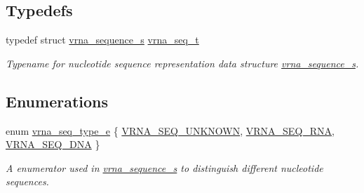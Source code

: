\subsection*{Typedefs}
\begin{DoxyCompactItemize}
\item 
\mbox{\label{group__alphabet__utils_gaa35bee3061759495467070b47d0e1f22}} 
typedef struct \mbox{\hyperlink{group__alphabet__utils_structvrna__sequence__s}{vrna\+\_\+sequence\+\_\+s}} \mbox{\hyperlink{group__alphabet__utils_gaa35bee3061759495467070b47d0e1f22}{vrna\+\_\+seq\+\_\+t}}
\begin{DoxyCompactList}\small\item\em Typename for nucleotide sequence representation data structure \mbox{\hyperlink{group__alphabet__utils_structvrna__sequence__s}{vrna\+\_\+sequence\+\_\+s}}. \end{DoxyCompactList}\end{DoxyCompactItemize}
\subsection*{Enumerations}
\begin{DoxyCompactItemize}
\item 
enum \mbox{\hyperlink{group__alphabet__utils_ga85cda3fcf5d6bd7ec090d3a96e808609}{vrna\+\_\+seq\+\_\+type\+\_\+e}} \{ \mbox{\hyperlink{group__alphabet__utils_gga85cda3fcf5d6bd7ec090d3a96e808609ad8682ac290d0dd51022e3b82840e1a74}{V\+R\+N\+A\+\_\+\+S\+E\+Q\+\_\+\+U\+N\+K\+N\+O\+WN}}, 
\mbox{\hyperlink{group__alphabet__utils_gga85cda3fcf5d6bd7ec090d3a96e808609ac52309234beaf94e6a3bd1b9b69de9f4}{V\+R\+N\+A\+\_\+\+S\+E\+Q\+\_\+\+R\+NA}}, 
\mbox{\hyperlink{group__alphabet__utils_gga85cda3fcf5d6bd7ec090d3a96e808609a4da1613644c3a3766ef1d6494f271332}{V\+R\+N\+A\+\_\+\+S\+E\+Q\+\_\+\+D\+NA}}
 \}
\begin{DoxyCompactList}\small\item\em A enumerator used in \mbox{\hyperlink{group__alphabet__utils_structvrna__sequence__s}{vrna\+\_\+sequence\+\_\+s}} to distinguish different nucleotide sequences. \end{DoxyCompactList}\end{DoxyCompactItemize}
